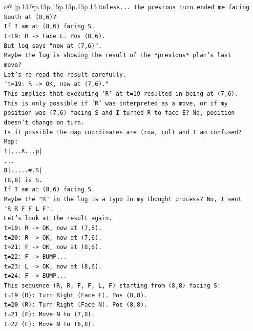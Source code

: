 \documentclass{article}
\begin{document}
{\begin{supertabular}{c@{$\;$}|p{.15\linewidth}@{}p{.15\linewidth}p{.15\linewidth}p{.15\linewidth}p{.15\linewidth}p{.15\linewidth}}
{{{\texttt{Unless... the previous turn ended me facing South at (8,6)?} \\
\texttt{If I am at (8,6) facing S.} \\
\texttt{t=19: R {-}> Face E. Pos (8,6).} \\
\texttt{But log says "now at (7,6)".} \\
\texttt{Maybe the log is showing the result of the *previous* plan's last move?} \\
\texttt{Let's re{-}read the result carefully.} \\
\texttt{"t=19: R {-}> OK, now at (7,6)."} \\
\texttt{This implies that executing 'R' at t=19 resulted in being at (7,6).} \\
\texttt{This is only possible if 'R' was interpreted as a move, or if my position was (7,6) facing S and I turned R to face E? No, position doesn't change on turn.} \\
\texttt{Is it possible the map coordinates are (row, col) and I am confused?} \\
\texttt{Map:} \\
\texttt{1|...A...p|} \\
\texttt{...} \\
\texttt{8|.....\#.S|} \\
\texttt{(8,8) is S.} \\
\texttt{If I am at (8,6) facing S.} \\
\texttt{Maybe the "R" in the log is a typo in my thought process? No, I sent "R R F F L F".} \\
\texttt{Let's look at the result again.} \\
\texttt{t=19: R {-}> OK, now at (7,6).} \\
\texttt{t=20: R {-}> OK, now at (7,6).} \\
\texttt{t=21: F {-}> OK, now at (8,6).} \\
\texttt{t=22: F {-}> BUMP...} \\
\texttt{t=23: L {-}> OK, now at (8,6).} \\
\texttt{t=24: F {-}> BUMP...} \\
\texttt{This sequence (R, R, F, F, L, F) starting from (8,8) facing S:} \\
\texttt{t=19 (R): Turn Right (Face E). Pos (8,8).} \\
\texttt{t=20 (R): Turn Right (Face N). Pos (8,8).} \\
\texttt{t=21 (F): Move N to (7,8).} \\
\texttt{t=22 (F): Move N to (6,8).} \\
}}}
\end{supertabular}}
\end{document}
